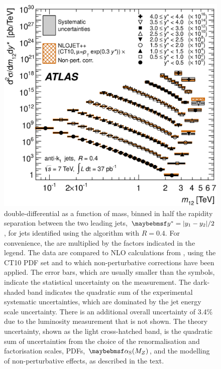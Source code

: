 \begin{figure}
  \includegraphics[width=\largefigwidth]{chapters/dijets/DijetMassYStarNLO_04.eps}
  \caption{\Dijet double-differential \xs as a function of \dijet mass, binned
     in half the rapidity separation between the two leading jets, $\yStar = |y_1 - y_2|/2$,
     for jets identified using the \akt algorithm with $R=0.4$. For convenience,
     the  are multiplied by the factors indicated in the legend. The
     data are compared to NLO \pQCD calculations from \NLOjetpp, using the CT10
     PDF set and to which non-perturbative corrections have been applied. The error
     bars, which are usually smaller than the symbols, indicate the statistical
     uncertainty on the measurement. The dark-shaded band indicates the quadratic
     sum of the experimental systematic uncertainties, which are dominated by
     the jet energy scale uncertainty. There is an additional overall uncertainty
     of 3.4\% due to the luminosity measurement that is not shown. The theory uncertainty,
     shown as the light cross-hatched band, is the quadratic sum of uncertainties
     from the choice of the renormalisation and factorisation scales, PDFs, $\alphaS(M_Z)$,
     and the modelling of non-perturbative effects, as described in the text.}
  \label{fig:dijets:InclusiveCrossSectionAKT4}
\end{figure}


